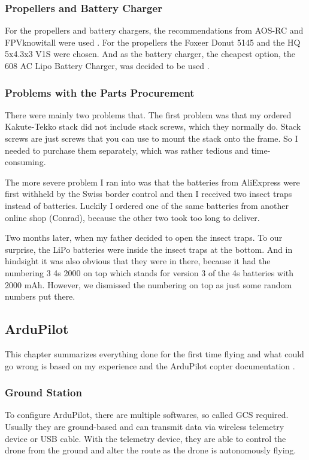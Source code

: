\documentclass[svgnames]{article}
\begin{document}
	\subsubsection{Propellers and Battery Charger}
	For the propellers and battery chargers, the recommendations from AOS-RC and FPVknowitall were used \cite{aosrc, fpvknowbattery}. For the propellers the Foxeer Donut 5145  and the HQ 5x4.3x3 V1S \cite{toroidal, hqprops} were chosen. And as the battery charger, the cheapest option, the 608 AC Lipo Battery Charger, was decided to be used \cite{lipocharger}.


	\subsubsection{Problems with the Parts Procurement}
	There were mainly two problems that. The first problem was that my ordered Kakute-Tekko stack did not include stack screws, which they normally do. Stack screws are just screws that you can use to mount the stack onto the frame. So I needed to purchase them separately, which was rather tedious and time-consuming.
	
	The more severe problem I ran into was that the batteries from AliExpress were first withheld by the Swiss border control and then I received two insect traps instead of batteries. Luckily I ordered one of the same batteries from another online shop (Conrad), because the other two took too long to deliver.
	
	Two months later, when my father decided to open the insect traps. To our surprise, the \gls{LiPo} batteries were inside the insect traps at the bottom. And in hindsight it was also obvious that they were in there, because it had the numbering 3 4s 2000 on top which stands for version 3 of the 4s batteries with 2000 mAh. However, we dismissed the numbering on top as just some random numbers put there. 
	
	\newpage
	\subsection{ArduPilot}
	This chapter summarizes everything done for the first time flying and what could go wrong is based on my experience and the ArduPilot copter documentation \cite{ardupilotdocs}.
	
	\subsubsection{Ground Station}
	To configure ArduPilot, there are multiple softwares, so called \gls{GCS} required. Usually they are ground-based and can transmit data via wireless telemetry device or USB cable.  With the telemetry device, they are able to control the drone from the ground and alter the route as the drone is autonomously flying. 
	
\end{document}
